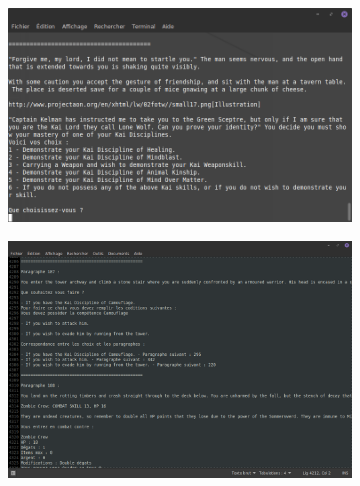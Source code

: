 		\begin{figure}[H]
			\centering
			\begin{subfigure}[c]{0.45\textwidth}
				\includegraphics[width=\textwidth, keepaspectratio]{img/jeu_choix.png}
			\end{subfigure}
			\hspace{1cm}
			\begin{subfigure}[c]{0.45\textwidth}
				\includegraphics[width=\textwidth, keepaspectratio]{img/export_txt.png}
			\end{subfigure}
		\end{figure}
